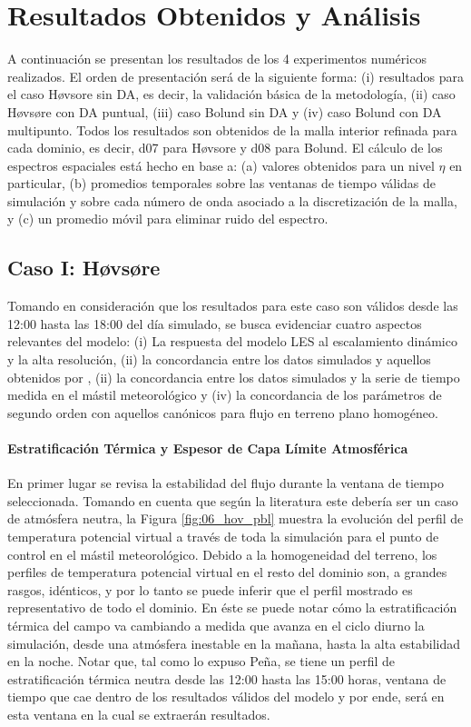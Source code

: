 \chapter{Resultados Obtenidos y Análisis}
A continuación se presentan los resultados de los 4 experimentos numéricos realizados. El orden de presentación será de la siguiente forma: (i) resultados para el caso Høvsore sin DA, es decir, la validación básica de la metodología, (ii) caso Høvsøre con DA puntual, (iii) caso Bolund sin DA y (iv) caso Bolund con DA multipunto. Todos los resultados son obtenidos de la malla interior refinada para cada dominio, es decir, d07 para Høvsore y d08 para Bolund. El cálculo de los espectros espaciales está hecho en base a: (a) valores obtenidos para un nivel $\eta$ en particular, (b) promedios temporales sobre las ventanas de tiempo válidas de simulación y sobre cada número de onda asociado a la discretización de la malla, y (c) un promedio móvil para eliminar ruido del espectro.
\section{Caso I: Høvsøre}
Tomando en consideración que los resultados para este caso son válidos desde las 12:00 hasta las 18:00 del día simulado, se busca evidenciar cuatro aspectos relevantes del modelo: (i) La respuesta del modelo LES al escalamiento dinámico y la alta resolución, (ii) la concordancia entre los datos simulados y aquellos obtenidos por \cite{Pea2013}, (ii) la concordancia entre los datos simulados y la serie de tiempo medida en el mástil meteorológico y (iv) la concordancia de los parámetros de segundo orden con aquellos canónicos para flujo en terreno plano homogéneo.

\subsubsection{Estratificación Térmica y Espesor de Capa Límite Atmosférica}
En primer lugar se revisa la estabilidad del flujo durante la ventana de tiempo seleccionada. Tomando en cuenta que según la literatura este debería ser un caso de atmósfera neutra, la Figura \ref{fig:06_hov_pbl} muestra la evolución del perfil de temperatura potencial virtual a través de toda la simulación para el punto de control en el mástil meteorológico. Debido a la homogeneidad del terreno, los perfiles de temperatura potencial virtual en el resto del dominio son, a grandes rasgos, idénticos, y por lo tanto se puede inferir que el perfil mostrado es representativo de todo el dominio. En éste se puede notar cómo la estratificación térmica del campo va cambiando a medida que avanza en el ciclo diurno la simulación, desde una atmósfera inestable en la mañana, hasta la alta estabilidad en la noche. Notar que, tal como lo expuso Peña, se tiene un perfil de estratificación térmica neutra desde las 12:00 hasta las 15:00 horas, ventana de tiempo que cae dentro de los resultados válidos del modelo y por ende, será en esta ventana en la cual se extraerán resultados.

